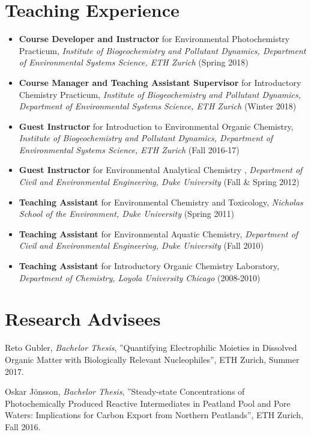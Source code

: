 \documentclass[letterpaper,10pt]{article}
\begin{document}
\section{Teaching Experience}
\begin{itemize}
	\item {\bfseries Course Developer and Instructor} for Environmental Photochemistry Practicum, \emph{Institute of Biogeochemistry and Pollutant Dynamics, Department of Environmental Systems Science, ETH Zurich} (Spring 2018)
	\item {\bfseries Course Manager and Teaching Assistant Supervisor} for Introductory Chemistry Practicum, \emph{Institute of Biogeochemistry and Pollutant Dynamics, Department of Environmental Systems Science, ETH Zurich} (Winter 2018)
	\item {\bfseries Guest Instructor} for Introduction to Environmental Organic Chemistry, \emph{Institute of Biogeochemistry and Pollutant Dynamics, Department of Environmental Systems Science, ETH Zurich} (Fall 2016-17)
	\item  {\bfseries Guest Instructor} for Environmental Analytical Chemistry , \emph{Department of Civil and Environmental Engineering, Duke University} (Fall \& Spring 2012)
	\item {\bfseries Teaching Assistant} for Environmental Chemistry and Toxicology, \emph{Nicholas School of the Environment, Duke University} (Spring 2011)
	\item {\bfseries Teaching Assistant} for Environmental Aquatic Chemistry, \emph{Department of Civil and Environmental Engineering, Duke University} (Fall 2010)
	\item {\bfseries Teaching Assistant} for Introductory Organic Chemistry Laboratory, \emph{Department of Chemistry, Loyola University Chicago} (2008-2010)
\end{itemize}
%
%
\section{Research Advisees } 
\begin{etaremune}
\item Reto Gubler, \emph{Bachelor Thesis}, ''Quantifying Electrophilic Moieties in Dissolved Organic Matter with Biologically Relevant Nucleophiles'', ETH Zurich, Summer 2017.
\item Oskar J\"{o}nsson, \emph{Bachelor Thesis}, ''Steady-state Concentrations of Photochemically Produced Reactive Intermediates in Peatland Pool and Pore Waters: Implications for Carbon Export from Northern Peatlands'', ETH Zurich, Fall 2016.
\end{etaremune}
%
\end{document}
